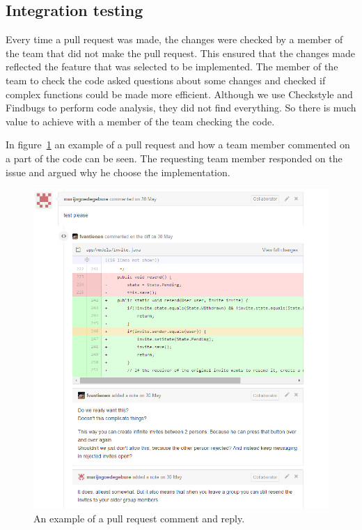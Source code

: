 \subsection{Integration testing}
\label{sec:integration}
Every time a pull request was made, the changes were checked by a member of the team that did not make the pull request.
This ensured that the changes made reflected the feature that was selected to be implemented.
The member of the team to check the code asked questions about some changes and checked if complex functions could be made more efficient.
Although we use Checkstyle and Findbugs to perform code analysis, they did not find everything.
So there is much value to achieve with a member of the team checking the code.

In figure~\ref{pullrequest-example} an example of a pull request and how a team member commented on a part of the code can be seen.
The requesting team member responded on the issue and argued why he choose the implementation.

\begin{figure}[H]
    \centering
    \includegraphics[width=\textwidth]{images/pullrequest-example1}
    \caption{An example of a pull request comment and reply.}
    \label{pullrequest-example}
\end{figure}

